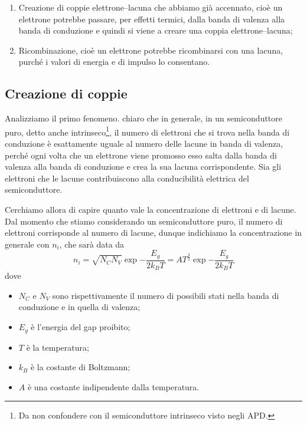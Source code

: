 \begin{enumerate}[leftmargin=0.6cm]
   \item Creazione di coppie elettrone--lacuna che abbiamo già accennato, cioè un elettrone potrebbe passare, per effetti termici, dalla banda di valenza alla banda di conduzione e quindi si viene a creare una coppia elettrone--lacuna;
   \item Ricombinazione, cioè un elettrone potrebbe ricombinarsi con una lacuna, purché i valori di energia e di impulso lo consentano.
\end{enumerate}

\subsection{Creazione di coppie}

Analizziamo il primo fenomeno. \E chiaro che in generale, in un semiconduttore puro, detto anche intrinseco\footnote{Da non confondere con il semiconduttore intrinseco visto negli APD.}, il numero di elettroni che si trova nella banda di conduzione è esattamente uguale al numero delle lacune in banda di valenza, perché ogni volta che un elettrone viene promosso esso salta dalla banda di valenza alla banda di conduzione e crea la sua lacuna corrispondente. Sia gli elettroni che le lacune contribuiscono alla conducibilità elettrica del semiconduttore. 

Cerchiamo allora di capire quanto vale la concentrazione di elettroni e di lacune. Dal momento che stiamo considerando un semiconduttore puro, il numero di elettroni corrisponde al numero di lacune, dunque indichiamo la concentrazione in generale con $n_i$, che sarà data da
\begin{equation*}
   n_i
   =\sqrt{N_C N_V} \exp{ -\frac{E_g}{2k_B T} }
   =AT^{\frac{3}{2}} \exp{ -\frac{E_g}{2k_B T} }
\end{equation*}
dove
\begin{itemize}[leftmargin=0.5cm]
   \item $N_C$ e $N_V$ sono rispettivamente il numero di possibili stati nella banda di conduzione e in quella di valenza;
   \item $E_g$ è l'energia del gap proibito;
   \item $T$ è la temperatura;
   \item $k_B$ è la costante di Boltzmann;
   \item $A$ è una costante indipendente dalla temperatura.
\end{itemize}

